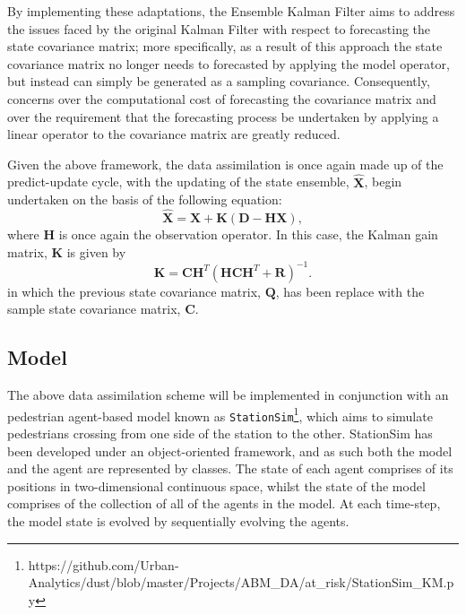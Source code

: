 By implementing these adaptations, the Ensemble Kalman Filter aims to address
the issues faced by the original Kalman Filter with respect to forecasting the
state covariance matrix; more specifically, as a result of this approach the
state covariance matrix no longer needs to forecasted by applying the model
operator, but instead can simply be generated as a sampling covariance.
Consequently, concerns over the computational cost of forecasting the covariance
matrix and over the requirement that the forecasting process be undertaken by
applying a linear operator to the covariance matrix are greatly reduced.

Given the above framework, the data assimilation is once again made up of the
predict-update cycle, with the updating of the state ensemble,
$\hat{\mathbf{X}}$, begin undertaken on the basis of the following equation: 
\begin{equation}
    \hat{\mathbf{X}} = \mathbf{X} + \mathbf{K}
                        \left(
                        \mathbf{D} - \mathbf{H} \mathbf{X}
                        \right),
\end{equation}
where $\mathbf{H}$ is once again the observation operator. 
In this case, the Kalman gain matrix, $\mathbf{K}$ is given by
\begin{equation}
    \mathbf{K} = \mathbf{C} \mathbf{H}^T
                     {\left(
                     \mathbf{H} \mathbf{C} \mathbf{H}^T
                     + \mathbf{R}
                     \right)} ^ {-1}.
\end{equation}
in which the previous state covariance matrix, $\mathbf{Q}$, has been replace
with the sample state covariance matrix, $\mathbf{C}$.

\subsection{Model}\label{sub:method:model}

The above data assimilation scheme will be implemented in conjunction with an
pedestrian agent-based model known as
\texttt{StationSim}\footnote{https://github.com/Urban-Analytics/dust/blob/master/Projects/ABM\_DA/at\_risk/StationSim\_KM.py},
which aims to simulate pedestrians crossing from one side of the station to the
other.
StationSim has been developed under an object-oriented framework, and as such
both the model and the agent are represented by classes.
The state of each agent comprises of its positions in two-dimensional continuous
space, whilst the state of the model comprises of the collection of all of the
agents in the model.
At each time-step, the model state is evolved by sequentially evolving the
agents.

